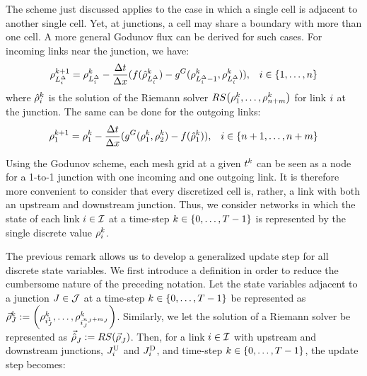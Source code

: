 						The scheme just discussed applies to the case in which a single cell
						is adjacent to another single cell. Yet, at junctions, a cell may
						share a boundary with more than one cell. A more general Godunov flux
						can be derived for such cases. For incoming links near the junction,
						we have: 
						\begin{align*}
							\discrete{\length_{\link}^{\Delta}}{\tind+1}=\discrete{\length_{\link}^{\Delta}}{\tind}-\dfrac{\Delta t}{\Delta x}(f(\trace{\dvar}_{\length_{\link}^{\Delta}}^{\tind})-\god(\discrete{L_{i}^{\Delta}-1}{\tind},\discrete{L_{i}^{\Delta}}{\tind})), &   & \link\in\left\{ 1,\ldots,\ninc\right\} 
						\end{align*}
						where $\hat{\rho}_{i}^{k}$ is the solution of the Riemann solver
						$\RS\tuple{\discrete 1{\tind}}{\discrete{\ninc+\nout}{\tind}}$ for
						link $i$ at the junction. The same can be done for the outgoing
						links: 
						\begin{align*}
							\discrete 1{\tind+1}=\discrete 1{\tind}-\dfrac{\Delta t}{\Delta x}(\god(\discrete 1{\tind},\discrete 2{\tind})-f(\trace{\dvar}_{1}^{\tind})), &   & \link\in\left\{ \ninc+1,\ldots,\ninc+\nout\right\} 
						\end{align*}
												
						\begin{rem}
							Using the Godunov scheme, each mesh grid at a given $t^{k}$ can
							be seen as a node for a 1-to-1 junction with one incoming and one
							outgoing link. It is therefore more convenient to consider that every
							discretized cell is, rather, a link with both an upstream and downstream
							junction. Thus, we consider networks in which the state of each link
							$i\in\mathcal{I}$ at a time-step $k\in\intrange 0{\ntime-1}$ is represented
							by the single discrete value $\rho_{i}^{k}$.
						\end{rem}
						The previous remark allows us to develop a generalized update step
						for all discrete state variables. We first introduce a definition
						in order to reduce the cumbersome nature of the preceding notation.
						Let the state variables adjacent to a junction $J\in\mathcal{J}$ at a
						time-step $\tind\in\intrange 0{\ntime-1}$ be represented as $\juncstate{\jn}{\tind}\defeq\tuple{\discrete{\link_{\jn}^{1}}{\tind}}{\discrete{\link_{\jn}^{\ninc_{\jn}+\nout_{\jn}}}{\tind}}$.
						Similarly, we let the solution of a Riemann solver be represented
						as $\junctrace{\jn}{}\defeq\RS\left(\juncstate{\jn}{}\right)$. Then,
						for a link $i\in\mathcal{I}$ with upstream and downstream junctions,
						$J_{i}^{\text{U}}$ and $J_{i}^{\text{D}}$, and time-step $\tind\in\left\{ 0,\ldots,\ntime-1\right\} $,
						the update step becomes:
												
